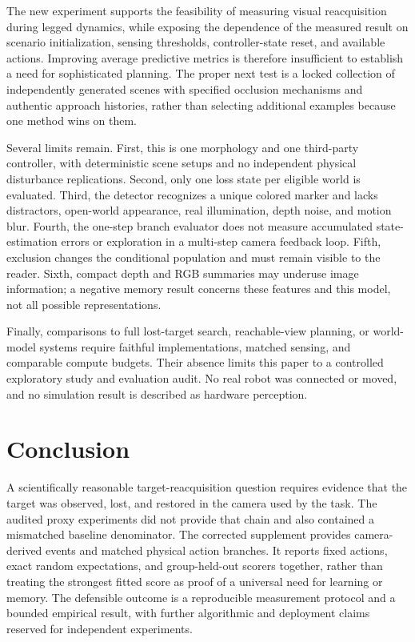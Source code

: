 \documentclass[10pt,twocolumn,a4paper]{article}
\begin{document}
The new experiment supports the feasibility of measuring visual reacquisition during legged dynamics, while exposing the dependence of the measured result on scenario initialization, sensing thresholds, controller-state reset, and available actions. Improving average predictive metrics is therefore insufficient to establish a need for sophisticated planning. The proper next test is a locked collection of independently generated scenes with specified occlusion mechanisms and authentic approach histories, rather than selecting additional examples because one method wins on them.

Several limits remain. First, this is one morphology and one third-party controller, with deterministic scene setups and no independent physical disturbance replications. Second, only one loss state per eligible world is evaluated. Third, the detector recognizes a unique colored marker and lacks distractors, open-world appearance, real illumination, depth noise, and motion blur. Fourth, the one-step branch evaluator does not measure accumulated state-estimation errors or exploration in a multi-step camera feedback loop. Fifth, exclusion changes the conditional population and must remain visible to the reader. Sixth, compact depth and RGB summaries may underuse image information; a negative memory result concerns these features and this model, not all possible representations.

Finally, comparisons to full lost-target search, reachable-view planning, or world-model systems require faithful implementations, matched sensing, and comparable compute budgets. Their absence limits this paper to a controlled exploratory study and evaluation audit. No real robot was connected or moved, and no simulation result is described as hardware perception.

\section{Conclusion}
A scientifically reasonable target-reacquisition question requires evidence that the target was observed, lost, and restored in the camera used by the task. The audited proxy experiments did not provide that chain and also contained a mismatched baseline denominator. The corrected supplement provides camera-derived events and matched physical action branches. It reports fixed actions, exact random expectations, and group-held-out scorers together, rather than treating the strongest fitted score as proof of a universal need for learning or memory. The defensible outcome is a reproducible measurement protocol and a bounded empirical result, with further algorithmic and deployment claims reserved for independent experiments.
\end{document}
